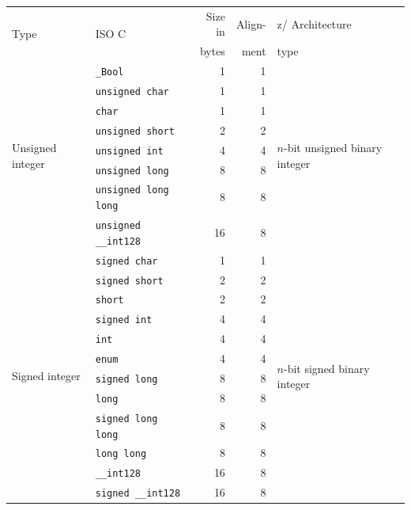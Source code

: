 \documentclass[USenglish,fontsize=11pt,twoside,%
  toc=bib,toc=idx,toc=graduated,numbers=noendperiod,
  bookmarks=true,
  bookmarksnumbered=true,
  bookmarksopen=true,
  bookmarksopenlevel=1,
  breaklinks=true,
  colorlinks=true,
  linkcolor=black,
  pdfpagelayout={TwoPageRight},
  pdfusetitle=true
]{scrreprt}
\newcommand{\NBYTES}{8}
\newcommand{\ARCH}{z/\kern-1pt Ar\-chi\-tec\-ture}
\newcommand{\NBYTES}{4}
\newcommand{\ARCH}{ESA/390}
\newenvironment{DIFnomarkup}{}{} %
\begin{document}
\begin{table}
  \centering
  \begin{DIFnomarkup}
  \begin{threeparttable}
    \begin{tabularx}{\textwidth}{XlrrX}
      \toprule
      \multirow{2}{*}{Type}
      & \multirow{2}{*}{ISO C}
      & Size in & Align- & \ARCH{} \\
      &
      & bytes   & ment   & type \\
      \midrule
      \multirow{8}{\hsize}{Unsigned integer}
      & \texttt{\_Bool} & 1 & 1
      & \multirow{8}{\hsize}{$n$-bit unsigned binary integer\tnote{\dagger}}
      \\
      & \texttt{unsigned char} & 1 & 1 \\
      & \texttt{char} & 1 & 1 \\
      & \texttt{unsigned short} & 2 & 2 \\
      & \texttt{unsigned int} & 4 & 4 \\
      & \texttt{unsigned long} & \NBYTES{} & \NBYTES{} \\
      & \texttt{unsigned long long} & 8 & 8 \\
      & \texttt{unsigned \_\_int128}\tnote{\ddagger} & 16 & 8 \\
      \midrule
      \multirow{12}{\hsize}{Signed integer}
      & \texttt{signed char} & 1 & 1
      & \multirow{12}{\hsize}{$n$-bit signed binary integer\tnote{\dagger}}
      \\
      & \texttt{signed short} & 2 & 2 \\
      & \texttt{short} & 2 & 2 \\
      & \texttt{signed int} & 4 & 4 \\
      & \texttt{int} & 4 & 4 \\
      & \texttt{enum} & 4 & 4 \\
      & \texttt{signed long} & \NBYTES{} & \NBYTES{} \\
      & \texttt{long} & \NBYTES{} & \NBYTES{} \\
      & \texttt{signed long long} & 8 & 8 \\
      & \texttt{long long} & 8 & 8 \\
      & \texttt{\_\_int128}\tnote{\ddagger} & 16 & 8 \\
      & \texttt{signed \_\_int128}\tnote{\ddagger} & 16 & 8 \\

\end{tabularx}
\end{threeparttable}
\end{DIFnomarkup}
\end{table}
\end{document}
